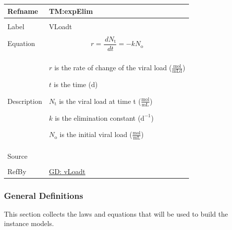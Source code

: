 \documentclass[12pt]{article}
\begin{document}
\vspace{\baselineskip}
\noindent
\begin{minipage}{\textwidth}
\begin{tabular}{>{\raggedright}p{}>{\raggedright\arraybackslash}p{}}
\toprule \textbf{Refname} & \textbf{TM:expElim}
\label{TM:expElim}
\\ \midrule \\
Label & VLoadt
        
\\ \midrule \\
Equation & \begin{displaymath}
           r=\frac{\,d{N_{\text{t}}}}{\,dt}=-k {N_{\text{o}}}
           \end{displaymath}
\\ \midrule \\
Description & \begin{symbDescription}
              \item{$r$ is the rate of change of the viral load ($\frac{\text{mol}}{\text{mL}\text{d}}$)}
              \item{$t$ is the time (${\text{d}}$)}
              \item{${N_{\text{t}}}$ is the viral load at time t ($\frac{\text{mol}}{\text{mL}}$)}
              \item{$k$ is the elimination constant ($\text{d}^{-1}$)}
              \item{${N_{\text{o}}}$ is the initial viral load ($\frac{\text{mol}}{\text{mL}}$)}
              \end{symbDescription}
\\ \midrule \\
Source & \cite{libretexts2020}
         
\\ \midrule \\
RefBy & \hyperref[GD:vLoadt]{GD: vLoadt}
        
\\ \bottomrule
\end{tabular}
\end{minipage}
\subsubsection{General Definitions}
\label{Sec:GDs}
This section collects the laws and equations that will be used to build the instance models.
\end{document}
